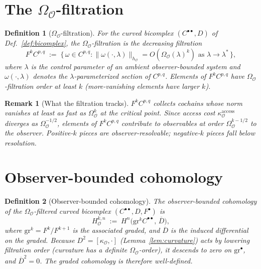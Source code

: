 \documentclass[11pt]{article}
\newtheorem{definition}{Definition}
\newtheorem{remark}{Remark}
\newcommand{\Obs}{\mathcal{O}}
\newcommand{\OmegaO}{\Omega_{\Obs}}
\newcommand{\kappaO}{\kappa_{\Obs}}
\newcommand{\hO}{h_{\Obs}}
\newcommand{\HO}{H_\Obs}
\begin{document}
\section{The $\OmegaO$-filtration}
\label{sec:filtration}

\begin{definition}[$\OmegaO$-filtration]
\label{def:filtration}
For the curved bicomplex $(C^{\bullet\bullet}, D)$ of
Def.~\ref{def:bicomplex}, the \emph{$\OmegaO$-filtration} is
the decreasing filtration
\[
F^k C^{p, q} \;:=\; \bigl\{\, \omega \in C^{p, q} :
\|\omega(\cdot, \lambda)\|_{\hO} = O(\OmegaO(\lambda)^{k})
\text{ as } \lambda \to \lambda^*\,\bigr\},
\]
where $\lambda$ is the control parameter of an ambient
observer-bounded system and $\omega(\cdot, \lambda)$ denotes the
$\lambda$-parameterized section of $C^{p,q}$. Elements of
$F^k C^{p, q}$ have $\OmegaO$-filtration \emph{order at least}
$k$ (more-vanishing elements have larger $k$).
\end{definition}

\begin{remark}[What the filtration tracks]
$F^k C^{p, q}$ collects cochains whose norm vanishes at least as
fast as $\OmegaO^k$ at the critical point. Since access cost
$\kappaO^{\mathrm{access}}$ diverges as $\OmegaO^{-1/2}$,
elements of $F^k C^{p, q}$ contribute to observables at order
$\OmegaO^{k - 1/2}$ to the observer. Positive-$k$ pieces are
observer-resolvable; negative-$k$ pieces fall below resolution.
\end{remark}

\section{Observer-bounded cohomology}
\label{sec:cohom}

\begin{definition}[Observer-bounded cohomology]
\label{def:ocoh}
The \emph{observer-bounded cohomology} of the $\OmegaO$-filtered
curved bicomplex $(C^{\bullet\bullet}, D, F^\bullet)$ is
\[
\HO^{k, n} \;:=\; H^n\bigl(\mathrm{gr}^k C^{\bullet\bullet},\,
\overline{D}\bigr),
\]
where $\mathrm{gr}^k = F^k / F^{k+1}$ is the associated graded,
and $\overline{D}$ is the induced differential on the graded.
Because $D^2 = [\kappaO, \cdot]$ (Lemma~\ref{lem:curvature})
acts by lowering filtration order (curvature has a definite
$\OmegaO$-order), it descends to zero on $\mathrm{gr}^\bullet$,
and $\overline{D}^2 = 0$. The graded cohomology is therefore
well-defined.
\end{definition}
\end{document}
